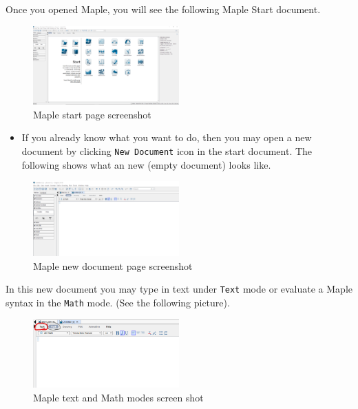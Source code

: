 \documentclass[en,11pt,simple]{elegantbook}
\begin{document}
Once you opened Maple, you will see the following Maple Start document.

\begin{figure}
\centering
\includegraphics[width=0.5\textwidth,height=\textheight]{figs/Maple-Start.png}
\caption{Maple start page screenshot}
\end{figure}

\begin{itemize}

\item
  If you already know what you want to do, then you may open a new document by clicking \texttt{New\ Document} icon in the start document. The following shows what an new (empty document) looks like.
\end{itemize}

\begin{figure}
\centering
\includegraphics[width=0.5\textwidth,height=\textheight]{figs/Maple-New-Doc.png}
\caption{Maple new document page screenshot}
\end{figure}

In this new document you may type in text under \texttt{Text} mode or evaluate a Maple syntax in the \texttt{Math} mode. (See the following picture).

\begin{figure}
\centering
\includegraphics[width=0.5\textwidth,height=\textheight]{figs/Text-Math-Mode.png}
\caption{Maple text and Math modes screen shot}
\end{figure}
\end{document}
